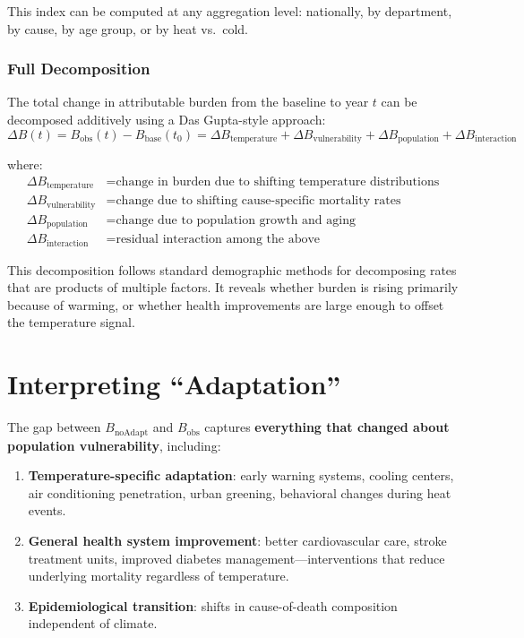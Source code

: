 \documentclass[11pt,a4paper]{article}
\begin{document}
This index can be computed at any aggregation level: nationally, by department, by cause, by age group, or by heat vs.\ cold.

\subsubsection{Full Decomposition}

The total change in attributable burden from the baseline to year $t$ can be decomposed additively using a Das Gupta-style approach:
\begin{equation}
  \Delta B(t) = B_{\text{obs}}(t) - B_{\text{base}}(t_0) = \Delta B_{\text{temperature}} + \Delta B_{\text{vulnerability}} + \Delta B_{\text{population}} + \Delta B_{\text{interaction}}
  \label{eq:dasgupta}
\end{equation}

where:
\begin{align*}
  \Delta B_{\text{temperature}} &= \text{change in burden due to shifting temperature distributions} \\
  \Delta B_{\text{vulnerability}} &= \text{change due to shifting cause-specific mortality rates} \\
  \Delta B_{\text{population}} &= \text{change due to population growth and aging} \\
  \Delta B_{\text{interaction}} &= \text{residual interaction among the above}
\end{align*}

This decomposition follows standard demographic methods for decomposing rates that are products of multiple factors. It reveals whether burden is rising primarily because of warming, or whether health improvements are large enough to offset the temperature signal.

\section{Interpreting ``Adaptation''}

The gap between $B_{\text{noAdapt}}$ and $B_{\text{obs}}$ captures \textbf{everything that changed about population vulnerability}, including:

\begin{enumerate}[nosep]
  \item \textbf{Temperature-specific adaptation}: early warning systems, cooling centers, air conditioning penetration, urban greening, behavioral changes during heat events.
  \item \textbf{General health system improvement}: better cardiovascular care, stroke treatment units, improved diabetes management---interventions that reduce underlying mortality regardless of temperature.
  \item \textbf{Epidemiological transition}: shifts in cause-of-death composition independent of climate.
\end{enumerate}
\end{document}

